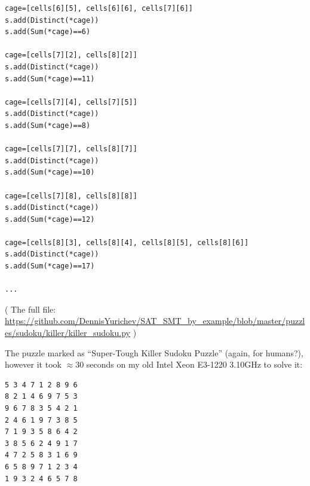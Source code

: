 \begin{lstlisting}
cage=[cells[6][5], cells[6][6], cells[7][6]]
s.add(Distinct(*cage))
s.add(Sum(*cage)==6)

cage=[cells[7][2], cells[8][2]]
s.add(Distinct(*cage))
s.add(Sum(*cage)==11)

cage=[cells[7][4], cells[7][5]]
s.add(Distinct(*cage))
s.add(Sum(*cage)==8)

cage=[cells[7][7], cells[8][7]]
s.add(Distinct(*cage))
s.add(Sum(*cage)==10)

cage=[cells[7][8], cells[8][8]]
s.add(Distinct(*cage))
s.add(Sum(*cage)==12)

cage=[cells[8][3], cells[8][4], cells[8][5], cells[8][6]]
s.add(Distinct(*cage))
s.add(Sum(*cage)==17)

...
\end{lstlisting}

( The full file: \url{https://github.com/DennisYurichev/SAT_SMT_by_example/blob/master/puzzles/sudoku/killer/killer_sudoku.py} )

The puzzle marked as ``Super-Tough Killer Sudoku Puzzle'' (again, for humans?),
however it took $\approx 30$ seconds on my old Intel Xeon E3-1220 3.10GHz to solve it:

\begin{lstlisting}
5 3 4 7 1 2 8 9 6
8 2 1 4 6 9 7 5 3
9 6 7 8 3 5 4 2 1
2 4 6 1 9 7 3 8 5
7 1 9 3 5 8 6 4 2
3 8 5 6 2 4 9 1 7
4 7 2 5 8 3 1 6 9
6 5 8 9 7 1 2 3 4
1 9 3 2 4 6 5 7 8
\end{lstlisting}

